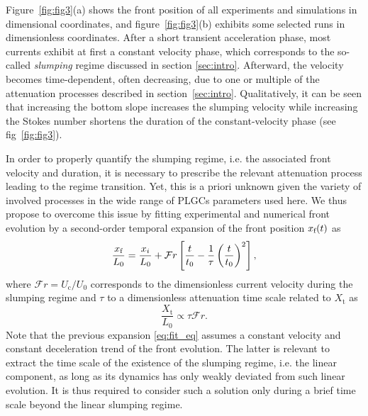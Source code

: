 \documentclass[12pt]{article}
\begin{document}
Figure~\ref{fig:fig3}(a) shows the front position of all experiments and simulations in dimensional coordinates, and figure~\ref{fig:fig3}(b) exhibits some selected runs in dimensionless coordinates. After a short transient acceleration phase, most currents exhibit at first a constant velocity phase, which corresponds to the so-called \emph{slumping} regime discussed in section \ref{sec:intro}. Afterward, the velocity becomes time-dependent, often decreasing, due to one or multiple of the attenuation processes described in section~\ref{sec:intro}.
%
Qualitatively, it can be seen that increasing the bottom slope increases the slumping velocity while increasing the Stokes number shortens the duration of the constant-velocity phase (see fig~\ref{fig:fig3}).

In order to properly quantify the slumping regime, i.e. the associated front velocity and duration, it is necessary to prescribe the relevant attenuation process leading to the regime transition. Yet, this is a priori unknown given the variety of involved processes in the wide range of PLGCs parameters used here. We thus propose to overcome this issue by fitting experimental and numerical front evolution by a second-order temporal expansion of the front position $x_{\text f}(t)$ as
\begin{equation}
	\label{eq:fit_eq}
	\frac{x_{\text f}}{L_{0}} = \frac{x_{i}}{L_0} + \mathcal{F}r \left[\frac{t}{t_{0}} - \frac{1}{\tau} \left(\frac{t}{t_{0}}\right)^{2}\right],
\end{equation}
where $\mathcal{F}r = U_{\text{c}}/U_{0}$ corresponds to the dimensionless current velocity during the slumping regime and $\tau$ to a dimensionless attenuation time scale related to $X_{\text{t}}$ as
\begin{equation}
	\label{eq:link_Xt_tau}
	\frac{X_{\text{t}}}{L_{0}} \propto \tau\mathcal{F}r.
\end{equation}
Note that the previous expansion \eqref{eq:fit_eq} assumes a constant velocity and constant deceleration trend of the front evolution. The latter is relevant to extract the time scale of the existence of the slumping regime, i.e. the linear component, as long as its dynamics has only weakly deviated from such linear evolution. It is thus required to consider such a solution only during a brief time scale beyond the linear slumping regime.
\end{document}

